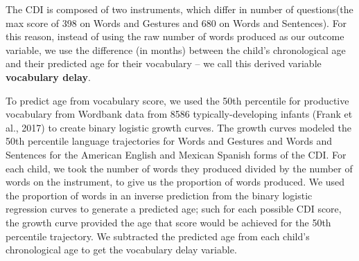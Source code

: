 \documentclass[english,man]{apa6}
\begin{document}
The CDI is composed of two instruments, which differ in number of questions(the max score of 398 on Words and Gestures and 680 on Words and Sentences). For this reason, instead of using the raw number of words produced as our outcome variable, we use the difference (in months) between the child's chronological age and their predicted age for their vocabulary -- we call this derived variable \textbf{vocabulary delay}.

To predict age from vocabulary score, we used the 50th percentile for productive vocabulary from Wordbank data from 8586 typically-developing infants (Frank et al., 2017) to create binary logistic growth curves. The growth curves modeled the 50th percentile language trajectories for Words and Gestures and Words and Sentences for the American English and Mexican Spanish forms of the CDI. For each child, we took the number of words they produced divided by the number of words on the instrument, to give us the proportion of words produced. We used the proportion of words in an inverse prediction from the binary logistic regression curves to generate a predicted age; such for each possible CDI score, the growth curve provided the age that score would be achieved for the 50th percentile trajectory. We subtracted the predicted age from each child's chronological age to get the vocabulary delay variable.
\end{document}
